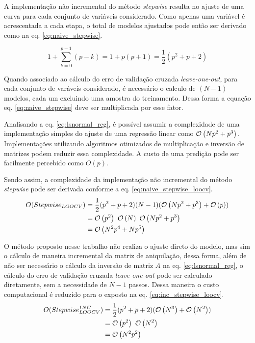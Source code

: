 A implementação não incremental do método \textit{stepwise} resulta no ajuste de uma curva para cada conjunto de variáveis considerado. Como apenas uma variável é acrescentada a cada etapa, o total de modelos ajustados pode então ser derivado como na eq. \ref{eq:naive_stepwise}.

\begin{equation}
    1 + \sum^{p-1}_{k=0} (p-k) = 1+p(p+1) = \frac{1}{2}(p^2+p+2)
    \label{eq:naive_stepwise} 
\end{equation}

Quando associado ao cálculo do erro de validação cruzada \textit{leave-one-out}, para cada conjunto de varáveis considerado, é necessário o calculo de $(N-1)$ modelos, cada um excluindo uma amostra do treinamento. Dessa forma a equação eq. \ref{eq:naive_stepwise} deve ser multiplicada por esse fator.

Analisando a eq. \ref{eq:lsnormal_reg}, é possível assumir a complexidade de uma implementação simples do ajuste de uma regressão linear como $\mathcal{O}\left(Np^2 + p^3\right)$. Implementações utilizando algoritmos otimizados de multiplicação e inversão de matrizes podem reduzir essa complexidade. A custo de uma predição pode ser facilmente percebido como $O(p)$.

Sendo assim, a complexidade da implementação não incremental do método \textit{stepwise} pode ser derivada conforme a eq. \ref{eq:naive_stepwise_loocv}.
\begin{equation}
    \begin{split}
        O(Stepwise_{LOOCV}) &= \frac{1}{2}(p^2+p+2)(N-1)(\mathcal{O}\left(Np^2 + p^3\right)+\mathcal{O}\left(p\right)) \\
                            &= \mathcal{O}\left(p^2\right)\ \mathcal{O}\left(N\right)\ \mathcal{O}\left(Np^2 + p^3\right) \\
                            &= \mathcal{O}\left(N^2p^4 + Np^5\right)
    \end{split}
    \label{eq:naive_stepwise_loocv}
\end{equation}

O método proposto nesse trabalho não realiza o ajuste direto do modelo, mas sim o cálculo de maneira incremental da matriz de aniquilação, dessa forma, além de não ser necessário o cálculo da inversão de matriz $A$ na eq. \ref{eq:lsnormal_reg}, o cálculo do erro de validação cruzada \textit{leave-one-out} pode ser calculado diretamente, sem a necessidade de $N-1$ passos. Dessa maneira o custo computacional é reduzido para o exposto na eq. \ref{eq:inc_stepwise_loocv}.
\begin{equation}
    \begin{split}
        O(Stepwise_{LOOCV}^{INC}) &= \frac{1}{2}(p^2+p+2)(\mathcal{O}\left(N^3\right)+\mathcal{O}\left(N^2\right)) \\
                            &= \mathcal{O}\left(p^2\right)\ \mathcal{O}\left(N^2\right) \\
                            &= \mathcal{O}\left(N^2p^2\right)
    \end{split}
    \label{eq:inc_stepwise_loocv}
\end{equation}

